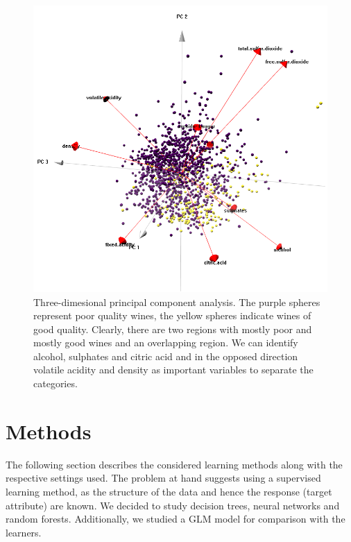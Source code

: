 \documentclass[11pt,]{article}
\begin{document}
\begin{figure}

{\centering \includegraphics[width=\linewidth]{./figures/pca-1} 

}

\caption{Three-dimesional principal component analysis. The purple spheres represent poor quality wines, the yellow spheres indicate wines of good quality. Clearly, there are two regions with mostly poor and mostly good wines and an overlapping region. We can identify alcohol, sulphates and citric acid and in the opposed direction volatile acidity and density as important variables to separate the categories.}\label{fig:pca}
\end{figure}

\hypertarget{methods}{%
\section{Methods}\label{methods}}

The following section describes the considered learning methods along
with the respective settings used. The problem at hand suggests using a
supervised learning method, as the structure of the data and hence the
response (target attribute) are known. We decided to study decision
trees, neural networks and random forests. Additionally, we studied a
GLM model for comparison with the learners.
\end{document}
